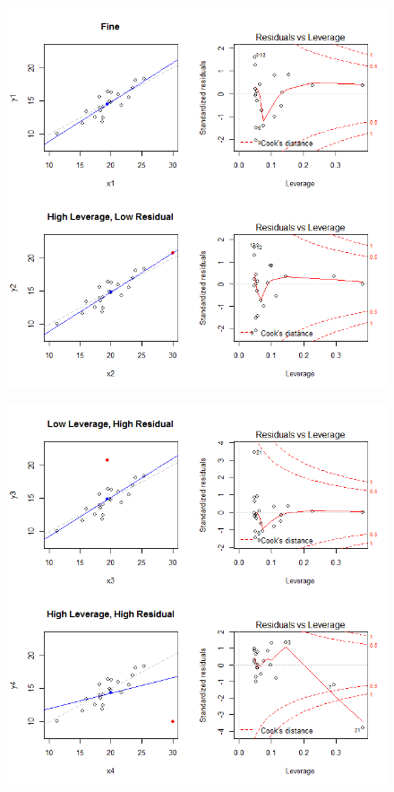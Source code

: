 \documentclass[residuals.tex]{subfiles}
\begin{document}
\begin{figure}[h!]
	\centering
	\includegraphics[width=1.0\linewidth]{plots2}
	\caption{}
	\label{fig:plots2}
\end{figure}
\begin{figure}[h!]
\centering
\includegraphics[width=1.0\linewidth]{plots3}
\caption{}
\label{fig:plots3}
\end{figure}
\end{document}

